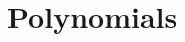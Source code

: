 \section{Polynomials}
\label{ch:Polynomials}

\cite{wiki:Polynomial,wiki:Factorization-of-polynomials}